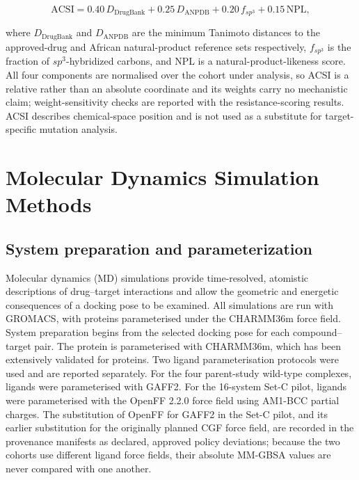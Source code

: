 \begin{equation}
\mathrm{ACSI} = 0.40\, D_{\mathrm{DrugBank}} + 0.25\, D_{\mathrm{ANPDB}} + 0.20\, f_{sp^3} + 0.15\, \mathrm{NPL},
\label{eq:acsi}
\end{equation}

where $D_{\mathrm{DrugBank}}$ and $D_{\mathrm{ANPDB}}$ are the minimum Tanimoto distances to the approved-drug and African natural-product reference sets respectively, $f_{sp^3}$ is the fraction of $sp^3$-hybridized carbons, and NPL is a natural-product-likeness score. All four components are normalised over the cohort under analysis, so ACSI is a relative rather than an absolute coordinate and its weights carry no mechanistic claim; weight-sensitivity checks are reported with the resistance-scoring results. ACSI describes chemical-space position and is not used as a substitute for target-specific mutation analysis.

\section{Molecular Dynamics Simulation Methods}\label{sec:md_methods}

\subsection{System preparation and parameterization}

Molecular dynamics (MD) simulations provide time-resolved, atomistic descriptions of drug--target interactions and allow the geometric and energetic consequences of a docking pose to be examined. All simulations are run with GROMACS\cite{Abraham2015}, with proteins parameterised under the CHARMM36m force field\cite{Huang2017CHARMM36m}. System preparation begins from the selected docking pose for each compound--target pair. The protein is parameterised with CHARMM36m, which has been extensively validated for proteins. Two ligand parameterisation protocols were used and are reported separately. For the four parent-study wild-type complexes, ligands were parameterised with GAFF2. For the \num{16}-system Set-C pilot, ligands were parameterised with the OpenFF 2.2.0 force field using AM1-BCC partial charges. The substitution of OpenFF for GAFF2 in the Set-C pilot, and its earlier substitution for the originally planned CGF force field, are recorded in the provenance manifests as declared, approved policy deviations; because the two cohorts use different ligand force fields, their absolute MM-GBSA values are never compared with one another.

